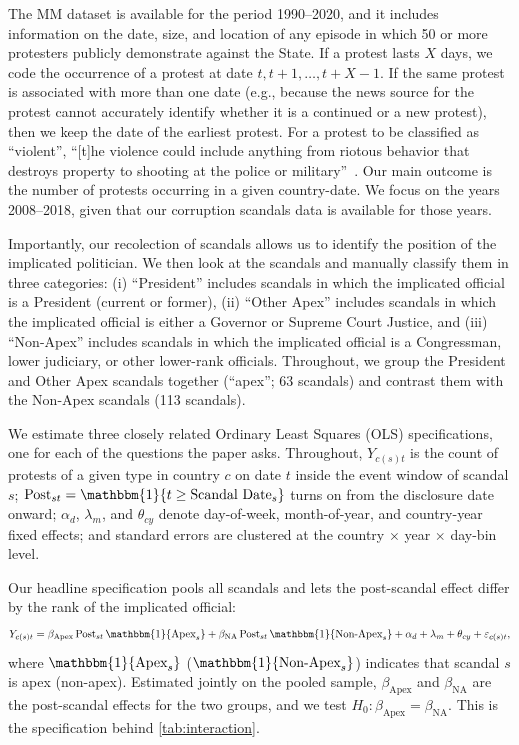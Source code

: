 \documentclass[11pt]{article}
\let\mathbetasym\beta
\renewcommand{\beta}{\ensuremath{\mathbetasym}}
\begin{document}
The MM dataset is available for the period 1990--2020, and it includes information on the date, size, and location of any episode in which 50 or more protesters publicly demonstrate against the State. If a protest lasts $X$ days, we code the occurrence of a protest at date $t, t+1, \dots, t+X-1$. If the same protest is associated with more than one date (e.g., because the news source for the protest cannot accurately identify whether it is a continued or a new protest), then we keep the date of the earliest protest. For a protest to be classified as ``violent'', ``[t]he violence could include anything from riotous behavior that destroys property to shooting at the police or military''~\citep{clark2016mass}. Our main outcome is the number of protests occurring in a given country-date. We focus on the years 2008--2018, given that our corruption scandals data is available for those years.

Importantly, our recolection of scandals allows us to identify the position of the implicated politician. We then look at the scandals and manually classify them in three categories: (i) ``President'' includes scandals in which the implicated official is a President (current or former), (ii) ``Other Apex'' includes scandals in which the implicated official is either a Governor or Supreme Court Justice, and (iii) ``Non-Apex'' includes scandals in which the implicated official is a Congressman, lower judiciary, or other lower-rank officials. Throughout, we group the President and Other Apex scandals together (``apex''; 63 scandals) and contrast them with the Non-Apex scandals (113 scandals).

We estimate three closely related Ordinary Least Squares (OLS) specifications, one for each of the questions the paper asks. Throughout, $Y_{c(s)t}$ is the count of protests of a given type in country $c$ on date $t$ inside the event window of scandal $s$; $\text{Post}_{st} = \mathbbm{1}\{t \geq \text{Scandal Date}_{s}\}$ turns on from the disclosure date onward; $\alpha_d$, $\lambda_m$, and $\theta_{cy}$ denote day-of-week, month-of-year, and country-year fixed effects; and standard errors are clustered at the country $\times$ year $\times$ day-bin level.

Our headline specification pools all scandals and lets the post-scandal effect differ by the rank of the implicated official:
\begin{equation}
\label{eq:interaction}
    Y_{c(s)t} = \beta_{\text{Apex}}\, \text{Post}_{st}\, \mathbbm{1}\{\text{Apex}_s\} + \beta_{\text{NA}}\, \text{Post}_{st}\, \mathbbm{1}\{\text{Non-Apex}_s\} + \alpha_{d} + \lambda_{m} + \theta_{cy} + \varepsilon_{c(s)t},
\end{equation}
where $\mathbbm{1}\{\text{Apex}_s\}$ ($\mathbbm{1}\{\text{Non-Apex}_s\}$) indicates that scandal $s$ is apex (non-apex). Estimated jointly on the pooled sample, $\beta_{\text{Apex}}$ and $\beta_{\text{NA}}$ are the post-scandal effects for the two groups, and we test $H_0:\beta_{\text{Apex}} = \beta_{\text{NA}}$. This is the specification behind \autoref{tab:interaction}.
\end{document}
